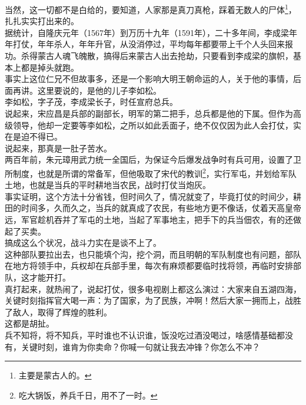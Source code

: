 \begin{multicols}{\theparacolNo}
当然，这一切都不是白给的，要知道，人家那是真刀真枪，踩着无数人的尸体\footnote{主要是蒙古人的。}，扎扎实实打出来的。\\

据统计，自隆庆元年（1567年）到万历十九年（1591年），二十多年间，李成梁年年打仗，年年杀人，年年升官，从没消停过，平均每年都要带上千个人头回来报功。杀得蒙古人魂飞魄散，搞得后来蒙古人出去抢劫，只要看到李成梁的旗帜，基本上都是掉头就跑。\\

事实上这位仁兄不但故事多，还是一个影响大明王朝命运的人，关于他的事情，后面再讲。这里要说的，是他的儿子李如松。\\

李如松，字子茂，李成梁长子，时任宣府总兵。\\

说起来，宋应昌是兵部的副部长，明军的第二把手，总兵都是他的下属。但作为高级领导，他却一定要等李如松，之所以如此丢面子，绝不仅仅因为此人会打仗，实在是迫不得已。\\

说起来，那真是一肚子苦水。\\

两百年前，朱元璋用武力统一全国后，为保证今后爆发战争时有兵可用，设置了卫所制度，也就是所谓的常备军，但他吸取了宋代的教训\footnote{吃大锅饭，养兵千日，用不了一时。}，实行军屯，并划给军队土地，也就是当兵的平时耕地当农民，战时打仗当炮灰。\\

事实证明，这个方法十分省钱，但时间久了，情况就变了，毕竟打仗的时间少，耕田的时间多，久而久之，当兵的就真成了农民，有些地方更不像话，仗着天高皇帝远，军官趁机吞并了军屯的土地，当起了军事地主，把手下的兵当佃农，有的还做起了买卖。\\

搞成这么个状况，战斗力实在是谈不上了。\\

这种部队要拉出去，也只能填个沟，挖个洞，而且明朝的军队制度也有问题，部队在地方将领手中，兵权却在兵部手里，每次有麻烦都要临时找将领，再临时安排部队，这才能开打。\\

真打起来，就热闹了，说起打仗，很多电视剧上都这么演过：大家来自五湖四海，关键时刻指挥官大喝一声：为了国家，为了民族，冲啊！然后大家一拥而上，战胜了敌人，取得了辉煌的胜利。\\

这都是胡扯。\\

兵不知将，将不知兵，平时谁也不认识谁，饭没吃过酒没喝过，啥感情基础都没有，关键时刻，谁肯为你卖命？你喊一句就让我去冲锋？你怎么不冲？\\


\end{multicols}
